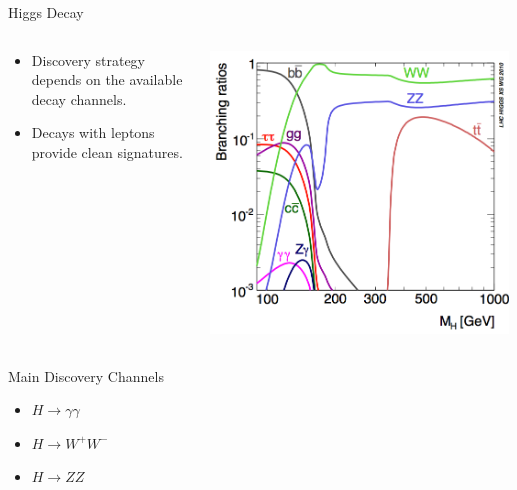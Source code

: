 \begin{frame}{Higgs Decay}
\begin{center}
\begin{columns}
  \begin{column}{0.5\textwidth}
    \begin{itemize}
      \item
        Discovery strategy depends on the available decay channels.
      \item
        Decays with leptons provide clean signatures.
    \end{itemize}
  \end{column}
  \begin{column}{0.5\textwidth}
    \includegraphics[width=0.99\textwidth]{images/branching_ratio.png}
  \end{column}
\end{columns}
Main Discovery Channels
\begin{itemize}
\item
  $H \rightarrow \gamma \gamma$
\item
  $H \rightarrow W^+W^-$
\item
  $H \rightarrow ZZ$
\end{itemize}
\end{center}
\end{frame}





